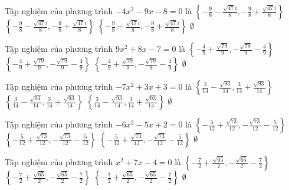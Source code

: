 \begin{ex}
Tập nghiệm của phương trình $- 4 x^{2} - 9 x - 8=0$ là
\choice
{$\left\{- \frac{9}{8} - \frac{\sqrt{47} i}{8}, - \frac{9}{8} + \frac{\sqrt{47} i}{8}\right\}$}
{$\left\{- \frac{9}{8} - \frac{\sqrt{47} i}{8}, - \frac{9}{8} + \frac{\sqrt{47} i}{8}\right\}$}
{$\left\{- \frac{9}{8} - \frac{\sqrt{47} i}{8}, - \frac{9}{8} + \frac{\sqrt{47} i}{8}\right\}$}
{$\emptyset$}
\end{ex}
\begin{ex}
Tập nghiệm của phương trình $9 x^{2} + 8 x - 7=0$ là
\choice
{$\left\{- \frac{4}{9} + \frac{\sqrt{79}}{9}, - \frac{\sqrt{79}}{9} - \frac{4}{9}\right\}$}
{$\left\{- \frac{4}{9} + \frac{\sqrt{79}}{9}, - \frac{\sqrt{79}}{9} - \frac{4}{9}\right\}$}
{$\left\{- \frac{4}{9} + \frac{\sqrt{79}}{9}, - \frac{\sqrt{79}}{9} - \frac{4}{9}\right\}$}
{$\emptyset$}
\end{ex}
\begin{ex}
Tập nghiệm của phương trình $- 7 x^{2} + 3 x + 3=0$ là
\choice
{$\left\{\frac{3}{14} - \frac{\sqrt{93}}{14}, \frac{3}{14} + \frac{\sqrt{93}}{14}\right\}$}
{$\left\{\frac{3}{14} - \frac{\sqrt{93}}{14}, \frac{3}{14} + \frac{\sqrt{93}}{14}\right\}$}
{$\left\{\frac{3}{14} - \frac{\sqrt{93}}{14}, \frac{3}{14} + \frac{\sqrt{93}}{14}\right\}$}
{$\emptyset$}
\end{ex}
\begin{ex}
Tập nghiệm của phương trình $- 6 x^{2} - 5 x + 2=0$ là
\choice
{$\left\{- \frac{5}{12} + \frac{\sqrt{73}}{12}, - \frac{\sqrt{73}}{12} - \frac{5}{12}\right\}$}
{$\left\{- \frac{5}{12} + \frac{\sqrt{73}}{12}, - \frac{\sqrt{73}}{12} - \frac{5}{12}\right\}$}
{$\left\{- \frac{5}{12} + \frac{\sqrt{73}}{12}, - \frac{\sqrt{73}}{12} - \frac{5}{12}\right\}$}
{$\emptyset$}
\end{ex}
\begin{ex}
Tập nghiệm của phương trình $x^{2} + 7 x - 4=0$ là
\choice
{$\left\{- \frac{7}{2} + \frac{\sqrt{65}}{2}, - \frac{\sqrt{65}}{2} - \frac{7}{2}\right\}$}
{$\left\{- \frac{7}{2} + \frac{\sqrt{65}}{2}, - \frac{\sqrt{65}}{2} - \frac{7}{2}\right\}$}
{$\left\{- \frac{7}{2} + \frac{\sqrt{65}}{2}, - \frac{\sqrt{65}}{2} - \frac{7}{2}\right\}$}
{$\emptyset$}
\end{ex}
